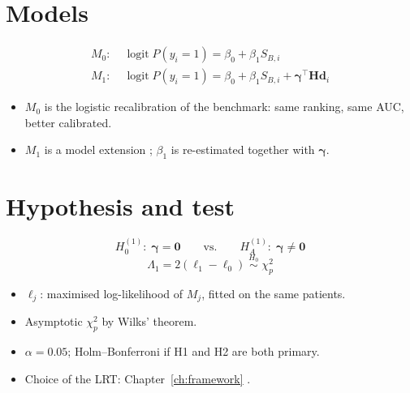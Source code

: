 \section{Models}
\begin{align}
    M_0:\;& \operatorname{logit} P(y_i = 1) = \beta_0 + \beta_1 S_{B,i} \\
    M_1:\;& \operatorname{logit} P(y_i = 1) = \beta_0 + \beta_1 S_{B,i} + \boldsymbol{\gamma}^{\top}\mathbf{Hd}_i
\end{align}
\begin{itemize}
    \item $M_0$ is the logistic recalibration of the benchmark: same ranking, same AUC, better calibrated. 
    \item $M_1$ is a model extension \cite{janssen_updating_2008}; $\beta_1$ is re-estimated together with $\boldsymbol{\gamma}$.
\end{itemize}

\section{Hypothesis and test}
\begin{equation}
    H_0^{(1)}:\; \boldsymbol{\gamma} = \mathbf{0}
    \qquad \text{vs.} \qquad
    H_A^{(1)}:\; \boldsymbol{\gamma} \neq \mathbf{0}
\end{equation}
\begin{equation}
    \Lambda_1 = 2\left(\ell_1 - \ell_0\right) \;\overset{H_0}{\sim}\; \chi^2_{p}
\end{equation}
\begin{itemize}
    \item $\ell_j$: maximised log-likelihood of $M_j$, fitted on the same patients.
    \item Asymptotic $\chi^2_p$ by Wilks' theorem. 
    \item $\alpha = 0.05$; Holm--Bonferroni if H1 and H2 are both primary.
    \item Choice of the LRT: Chapter~\ref{ch:framework} \cite{pepe_testing_2013}.
\end{itemize}

